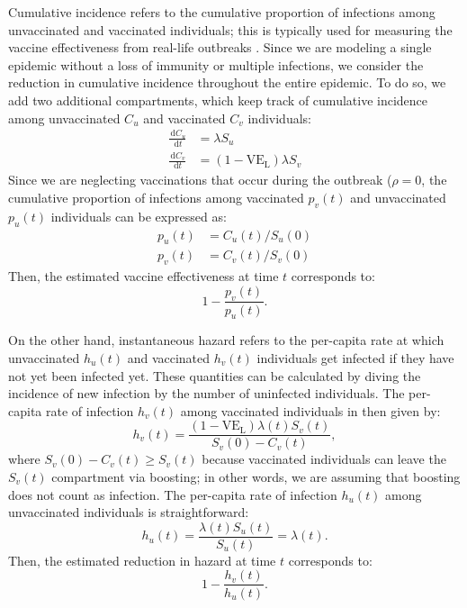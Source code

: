 \documentclass[12pt]{article}
\newcommand{\dd}[1]{\ensuremath{\, \mathrm{d}#1}}
\newcommand{\VE}{\ensuremath{\mathrm{VE}}}
\newcommand{\VEL}{\ensuremath{\VE_{\mathrm{L}}}}
\begin{document}
Cumulative incidence refers to the cumulative proportion of infections among unvaccinated and vaccinated individuals; 
this is typically used for measuring the vaccine effectiveness from real-life outbreaks \citep{farrington1993estimation}.
Since we are modeling a single epidemic without a loss of immunity or multiple infections, we consider the reduction in cumulative incidence throughout the entire epidemic.
To do so, we add two additional compartments, which keep track of cumulative incidence among unvaccinated $C_u$ and vaccinated $C_v$ individuals:
\begin{align}
\frac{\dd C_u}{\dd t} &= \lambda S_u\\
\frac{\dd C_v}{\dd t} &= (1-\VEL) \lambda S_v
\end{align}
Since we are neglecting vaccinations that occur during the outbreak ($\rho=0$, the cumulative proportion of infections among vaccinated $p_v(t)$ and unvaccinated $p_u(t)$ individuals can be expressed as:
\begin{align}
p_u(t) &= C_u(t)/S_u(0)\\
p_v(t) &= C_v(t)/S_v(0)
\end{align}
Then, the estimated vaccine effectiveness at time $t$ corresponds to:
\begin{equation}
1 - \frac{p_v(t)}{p_u(t)}.
\end{equation}

On the other hand, instantaneous hazard refers to the per-capita rate at which unvaccinated $h_u(t)$ and vaccinated $h_v(t)$ individuals get infected if they have not yet been infected yet.
These quantities can be calculated by diving the incidence of new infection by the number of uninfected individuals.
The per-capita rate of infection $h_v(t)$ among vaccinated individuals in then given by:
\begin{equation}
h_v(t) = \frac{(1-\VEL) \lambda(t) S_v(t)}{S_v(0) - C_v(t)},
\end{equation}
where $S_v(0) - C_v(t) \geq S_v(t)$ because vaccinated individuals can leave the $S_v(t)$ compartment via boosting;
in other words, we are assuming that boosting does not count as infection.
The per-capita rate of infection $h_u(t)$ among unvaccinated individuals is straightforward: 
\begin{equation}
h_u(t) = \frac{\lambda(t) S_u(t)}{S_u(t)} = \lambda(t).
\end{equation}
Then, the estimated reduction in hazard at time $t$ corresponds to:
\begin{equation}
1 - \frac{h_v(t)}{h_u(t)}.
\end{equation}
\end{document}
